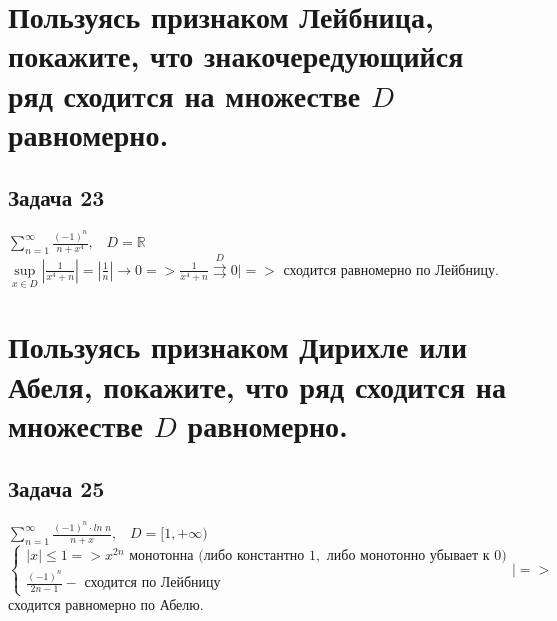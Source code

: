\documentclass[a4paper, fleqn]{article}
\begin{document}
    
    
    \section*{Пользуясь признаком Лейбница, покажите, что знакочередующийся ряд сходится на множестве $D$
        равномерно.}
    \subsection*{Задача 23}
    $\sum\limits_{n = 1}^{\infty} \frac{(-1)^n}{n + x^4}, \; \; \; D = \mathbb{R}$ \\
    $\sup\limits_{x \in D} \left| \frac{1}{x^4 + n} \right| = \left| \frac{1}{n} \right| \rightarrow 0 => \frac{1}{x^4 + n} \stackrel{D}{\rightrightarrows} 0 \bigg| =>$ сходится равномерно по Лейбницу.\\
   
    
    \section*{Пользуясь признаком Дирихле или Абеля, покажите, что ряд сходится на множестве $D$ равномерно.}
    \subsection*{Задача 25}
    $\sum\limits_{n = 1}^{\infty} \frac{(-1)^n \cdot ln\; n}{n + x}, \; \; \; D = [1, +\infty)$ \\
    $\begin{cases} |x| \leq 1 => x^{2n} \text{ монотонна (либо константно }1,\text{ либо монотонно убывает к }0) \\ \frac{(-1)^n}{2n - 1} - \text{ сходится по Лейбницу} \end{cases} \bigg| => $ сходится равномерно по Абелю. \\
    
\end{document}
